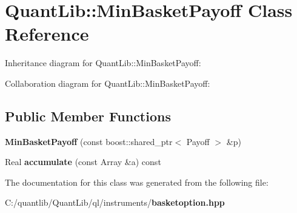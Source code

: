 \section{Quant\+Lib\+:\+:Min\+Basket\+Payoff Class Reference}
\label{class_quant_lib_1_1_min_basket_payoff}


Inheritance diagram for Quant\+Lib\+:\+:Min\+Basket\+Payoff\+:


Collaboration diagram for Quant\+Lib\+:\+:Min\+Basket\+Payoff\+:
\subsection*{Public Member Functions}
\begin{DoxyCompactItemize}
\item 
{\bfseries Min\+Basket\+Payoff} (const boost\+::shared\+\_\+ptr$<$ Payoff $>$ \&p)\label{class_quant_lib_1_1_min_basket_payoff_aa37ba6c95ea541270ecc5c7e07af56ab}

\item 
Real {\bfseries accumulate} (const Array \&a) const \label{class_quant_lib_1_1_min_basket_payoff_a7726c682e333dd1595c5acadfa106f53}

\end{DoxyCompactItemize}


The documentation for this class was generated from the following file\+:\begin{DoxyCompactItemize}
\item 
C\+:/quantlib/\+Quant\+Lib/ql/instruments/{\bf basketoption.\+hpp}\end{DoxyCompactItemize}
